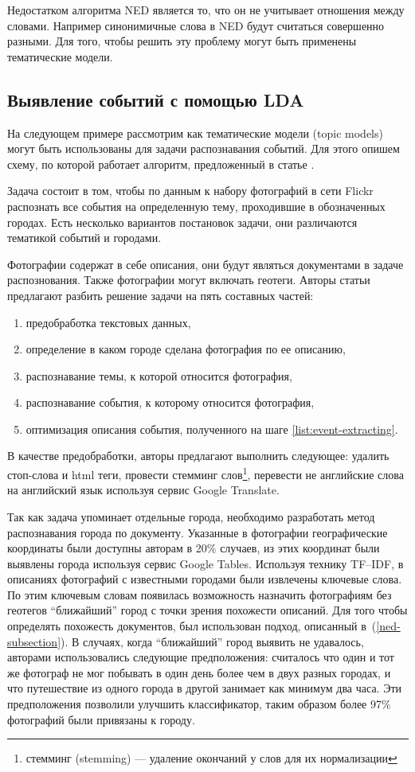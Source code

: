 \documentclass[14pt,a4paper,oneside]{extarticle}
\begin{document}
	Недостатком алгоритма NED является то, что он не учитывает отношения между словами. Например синонимичные слова в NED будут считаться совершенно разными. Для того, чтобы решить эту проблему могут быть применены тематические модели.
	
	\subsection{Выявление событий с помощью LDA}
	\label{lda-subsection}
  На следующем примере рассмотрим как тематические модели (topic models) могут быть использованы для задачи распознавания событий. Для этого опишем схему, по которой работает алгоритм, предложенный в статье  \cite{mediaeval}. 
  
  Задача состоит в том, чтобы по данным к набору фотографий в сети Flickr распознать все события на определенную тему, проходившие в обозначенных городах. Есть несколько вариантов постановок задачи, они различаются тематикой событий и городами. 
  
  Фотографии содержат в себе описания, они будут являться документами в задаче распознования. Также фотографии могут включать геотеги. Авторы статьи предлагают разбить решение задачи на пять составных частей: 
  \begin{enumerate}
  \item предобработка текстовых данных,
  \item определение в каком городе сделана фотография по ее описанию,
  \item распознавание темы, к которой относится фотография,
  \item распознавание события, к которому относится фотография, \label{list:event-extracting}
  \item оптимизация описания события, полученного на шаге \ref{list:event-extracting}.
  \end{enumerate}
  
  В качестве предобработки, авторы предлагают выполнить следующее: удалить стоп-слова и html теги, провести стемминг слов\footnote{стемминг (stemming) --- удаление окончаний у слов для их нормализации}, перевести не английские слова на английский язык используя сервис Google Translate.
  
	Так как задача упоминает отдельные города, необходимо разработать метод распознавания города по документу. Указанные в фотографии географические координаты были доступны авторам в 20\% случаев, из этих координат были выявлены города используя сервис Google Tables. Используя технику TF--IDF, в описаниях фотографий с известными городами были извлечены ключевые слова. По этим ключевым словам появилась возможность назначить фотографиям без геотегов ``ближайший'' город с точки зрения похожести описаний. Для того чтобы определять похожесть документов, был использован подход, описанный в~(\ref{ned-subsection}). В случаях, когда ``ближайший'' город выявить не удавалось, авторами использовались следующие предположения: считалось что один и тот же фотограф не мог побывать в один день более чем в двух разных городах, и что путешествие из одного города в другой занимает как минимум два часа. Эти предположения позволили улучшить классификатор, таким образом более 97\% фотографий были привязаны к городу.
	
\end{document}
